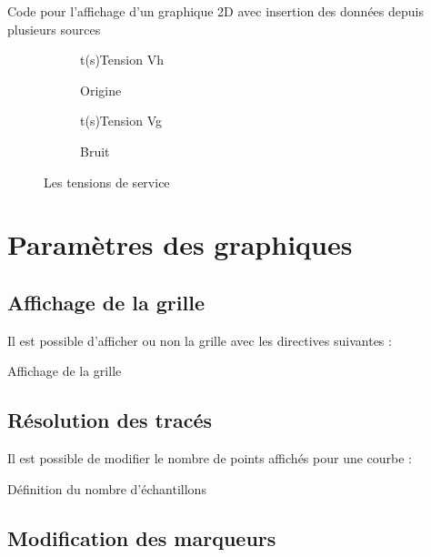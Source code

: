 {\begin{Latex}{Code pour l'affichage d'un graphique 2D avec insertion des données depuis plusieurs sources}
      \begin{figure}[h!]  
        \centering 
          \begin{subfigure}[b]{0.4\linewidth}
            \begin{graphic}{0.8}{1}{0}{1.2}{-1}{5}{t(s)}{Tension V}{h}
              \end{graphic}%
            \caption{Origine} 
          \end{subfigure}
        \begin{subfigure}[b]{0.4\linewidth}
          \begin{graphic}{0.8}{1}{0}{4}{-0.3}{0.3}{t(s)}{Tension V}{g}
            \end{graphic}%
        \caption{Bruit}
        \end{subfigure}
        \caption{Les tensions de service}
        \end{figure}  
    \end{Latex}

  

\section{Paramètres des graphiques}

\subsection{Affichage de la grille}
Il est possible d'afficher ou non la grille avec les directives suivantes : 

\begin{Latex}{Affichage de la grille}
\enableGrid
\disableGrid
\end{Latex}


\subsection{Résolution des tracés}
Il est possible de modifier le nombre de points affichés pour une courbe :\\

\begin{Latex}{Définition du nombre d'échantillons}
\end{Latex}

\subsection{Modification des marqueurs}

}
